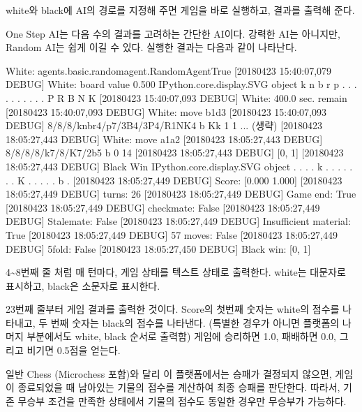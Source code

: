 \documentclass[letterpaper,10pt,english]{sphinxmanual}
\begin{document}
white와 black에 AI의 경로를 지정해 주면 게임을 바로 실행하고, 결과를 출력해 준다.

One Step AI는 다음 수의 결과를 고려하는 간단한 AI이다. 강력한 AI는 아니지만, Random AI는 쉽게 이길 수 있다.
실행한 결과는 다음과 같이 나타난다.

%
\begin{sphinxVerbatim} White: agents.basic.random\PYGZus{}agent.RandomAgent\PYGZhy{}True
[2018\PYGZhy{}04\PYGZhy{}23 15:40:07,079 DEBUG] White: board value 0.500
\PYGZlt{}IPython.core.display.SVG object\PYGZgt{}
k n b r
p . . .
. . . .
. . . P
R B N K
[2018\PYGZhy{}04\PYGZhy{}23 15:40:07,093 DEBUG] White: 400.0 sec. remain
[2018\PYGZhy{}04\PYGZhy{}23 15:40:07,093 DEBUG] White: move b1d3
[2018\PYGZhy{}04\PYGZhy{}23 15:40:07,093 DEBUG] 8/8/8/knbr4/p7/3B4/3P4/R1NK4 b Kk \PYGZhy{} 1 1
...  (생략)
[2018\PYGZhy{}04\PYGZhy{}23 18:05:27,443 DEBUG] White: move a1a2
[2018\PYGZhy{}04\PYGZhy{}23 18:05:27,443 DEBUG] 8/8/8/8/k7/8/K7/2b5 b \PYGZhy{} \PYGZhy{} 0 14
[2018\PYGZhy{}04\PYGZhy{}23 18:05:27,443 DEBUG] [0, 1]
[2018\PYGZhy{}04\PYGZhy{}23 18:05:27,443 DEBUG] Black Win
\PYGZlt{}IPython.core.display.SVG object\PYGZgt{}
. . . .
k . . .
. . . .
K . . .
. . b .
[2018\PYGZhy{}04\PYGZhy{}23 18:05:27,449 DEBUG] Score: [0.000 1.000]
[2018\PYGZhy{}04\PYGZhy{}23 18:05:27,449 DEBUG] turns: 26
[2018\PYGZhy{}04\PYGZhy{}23 18:05:27,449 DEBUG] Game end: True
[2018\PYGZhy{}04\PYGZhy{}23 18:05:27,449 DEBUG] checkmate: False
[2018\PYGZhy{}04\PYGZhy{}23 18:05:27,449 DEBUG] Stalemate: False
[2018\PYGZhy{}04\PYGZhy{}23 18:05:27,449 DEBUG] Insufficient material: True
[2018\PYGZhy{}04\PYGZhy{}23 18:05:27,449 DEBUG] 57 moves: False
[2018\PYGZhy{}04\PYGZhy{}23 18:05:27,449 DEBUG] 5\PYGZhy{}fold: False
[2018\PYGZhy{}04\PYGZhy{}23 18:05:27,450 DEBUG] Black win: [0, 1]
\end{sphinxVerbatim}

4\textasciitilde{}8번째 줄 처럼 매 턴마다, 게임 상태를 텍스트 상태로 출력한다. white는 대문자로 표시하고, black은 소문자로 표시한다.

23번째 줄부터 게임 결과를 출력한 것이다. Score의 첫번째 숫자는 white의 점수를 나타내고, 두 번째 숫자는 black의 점수를 나타낸다.
(특별한 경우가 아니면 플랫폼의 나머지 부분에서도 white, black 순서로 출력함)
게임에 승리하면 1.0, 패배하면 0.0, 그리고 비기면 0.5점을 얻는다.

일반 Chess (Microchess 포함)와 달리 이 플랫폼에서는 승패가 결정되지 않으면,
게임이 종료되었을 때 남아있는 기물의 점수를 계산하여 최종 승패를 판단한다.
따라서, 기존 무승부 조건을 만족한 상태에서 기물의 점수도 동일한 경우만 무승부가 가능하다.
\end{document}
